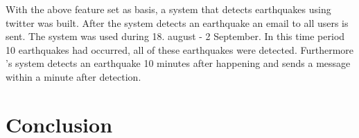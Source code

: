\documentclass{article}
\begin{document}
With the above feature set as basis, a system that detects earthquakes using twitter was built. After the system detects an earthquake an email to all users is sent. The system was used during 18. august - 2 September. In this time period 10 earthquakes had occurred, all of these earthquakes were detected. Furthermore \cite{earthq}'s system detects an earthquake 10 minutes after happening and sends a message within a minute after detection. 
\section{Conclusion}



\end{document}

